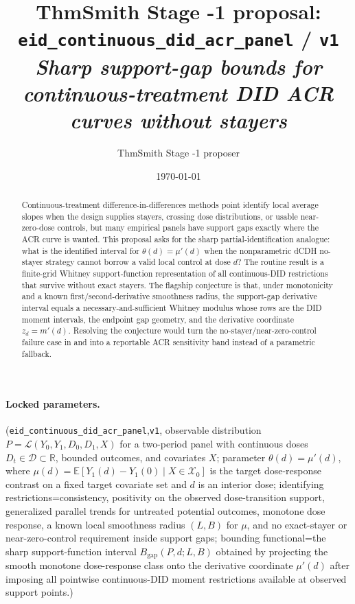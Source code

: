 \documentclass[11pt]{article}
\title{ThmSmith Stage -1 proposal: \texttt{eid\_continuous\_did\_acr\_panel} / \texttt{v1}%
  \\ \large\textit{Sharp support-gap bounds for continuous-treatment DID ACR curves without stayers}}
\author{ThmSmith Stage -1 proposer}
\date{\today}
\newcommand{\E}{\mathbb{E}}
\theoremstyle{definition}
\theoremstyle{plain}
\theoremstyle{remark}
\begin{document}
\maketitle


\paragraph{Locked parameters.}
(\texttt{eid\_continuous\_did\_acr\_panel},\texttt{v1},
observable distribution \(P=\mathcal L(Y_0,Y_1,D_0,D_1,X)\) for a two-period panel with continuous doses \(D_t\in\mathcal D\subset\mathbb R\), bounded outcomes, and covariates \(X\);
parameter \(\theta(d)=\mu'(d)\), where \(\mu(d)=\E[Y_1(d)-Y_1(0)\mid X\in\mathcal X_0]\) is the target dose-response contrast on a fixed target covariate set and \(d\) is an interior dose;
identifying restrictions=consistency, positivity on the observed dose-transition support, generalized parallel trends for untreated potential outcomes, monotone dose response, a known local smoothness radius \((L,B)\) for \(\mu\), and no exact-stayer or near-zero-control requirement inside support gaps;
bounding functional=the sharp support-function interval \(B_{\mathrm{gap}}(P,d;L,B)\) obtained by projecting the smooth monotone dose-response class onto the derivative coordinate \(\mu'(d)\) after imposing all pointwise continuous-DID moment restrictions available at observed support points.)

\begin{abstract}
Continuous-treatment difference-in-differences methods point identify local average slopes when the design supplies stayers, crossing dose distributions, or usable near-zero-dose controls, but many empirical panels have support gaps exactly where the ACR curve is wanted.  This proposal asks for the sharp partial-identification analogue: what is the identified interval for \(\theta(d)=\mu'(d)\) when the nonparametric dCDH no-stayer strategy cannot borrow a valid local control at dose \(d\)?  The routine result is a finite-grid Whitney support-function representation of all continuous-DID restrictions that survive without exact stayers.  The flagship conjecture is that, under monotonicity and a known first/second-derivative smoothness radius, the support-gap derivative interval equals a necessary-and-sufficient Whitney modulus whose rows are the DID moment intervals, the endpoint gap geometry, and the derivative coordinate \(z_d=m'(d)\).  Resolving the conjecture would turn the no-stayer/near-zero-control failure case in \citet{deChaisemartinDHaultfoeuilleVazquezBare2024} and \citet{deChaisemartinCicciaDHaultfoeuilleKnau2024} into a reportable ACR sensitivity band instead of a parametric fallback.
\end{abstract}
\end{document}
